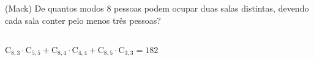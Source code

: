 \begin{ex}
 	(Mack) De quantos modos 8 pessoas podem ocupar duas salas distintas, devendo cada sala conter pelo menos três pessoas?
 	  \begin{sol}
 	    \phantom{A} \\
 	    $\mathrm{C}_{8,3}\cdot\mathrm{C}_{5,5}+\mathrm{C}_{8,4}\cdot\mathrm{C}_{4,4}+\mathrm{C}_{8,5}\cdot\mathrm{C}_{3,3}=182$
 	  \end{sol}
\end{ex}